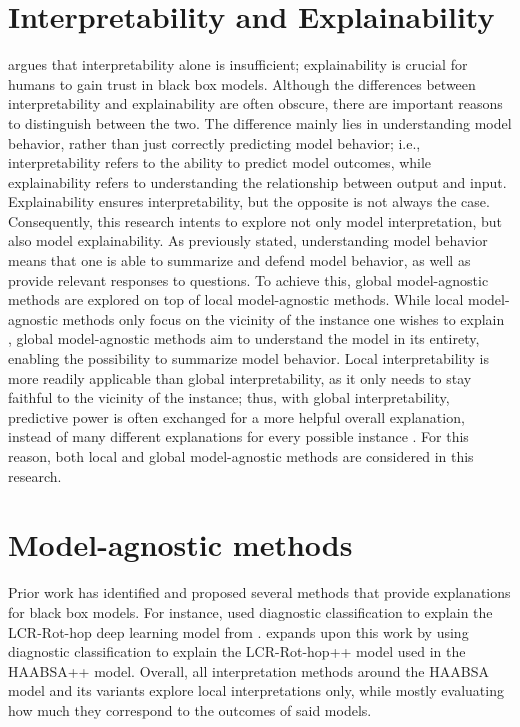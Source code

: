\section{Interpretability and Explainability}
    \label{sec:lit_interpret_explain}
\cite{Gilpin} argues that interpretability alone is insufficient; explainability is crucial for humans to gain trust in black box models. Although the differences between interpretability and explainability are often obscure, there are important reasons to distinguish between the two. The difference mainly lies in understanding model behavior, rather than just correctly predicting model behavior; i.e., interpretability refers to the ability to predict model outcomes, while explainability refers to understanding the relationship between output and input. Explainability ensures interpretability, but the opposite is not always the case. Consequently, this research intents to explore not only model interpretation, but also model explainability. As previously stated, understanding model behavior means that one is able to summarize and defend model behavior, as well as provide relevant responses to questions. To achieve this, global model-agnostic methods are explored on top of local model-agnostic methods. While local model-agnostic methods only focus on the vicinity of the instance one wishes to explain \cite{Ribeiro}, global model-agnostic methods aim to understand the model in its entirety, enabling the possibility to summarize model behavior. Local interpretability is more readily applicable than global interpretability, as it only needs to stay faithful to the vicinity of the instance; thus, with global interpretability, predictive power is often exchanged for a more helpful overall explanation, instead of many different explanations for every possible instance \cite{Adadi}. For this reason, both local and global model-agnostic methods are considered in this research.

\section{Model-agnostic methods}
    \label{sec:lit_model_agnostic}
Prior work has identified and proposed several methods that provide explanations for black box models. For instance, \cite{Meijer} used diagnostic classification to explain the LCR-Rot-hop deep learning model from \cite{Wallaart}. \cite{Geed} expands upon this work by using diagnostic classification to explain the LCR-Rot-hop++ model used in the HAABSA++ model. Overall, all interpretation methods around the HAABSA model and its variants explore local interpretations only, while mostly evaluating how much they correspond to the outcomes of said models.

